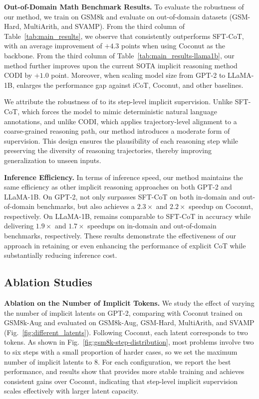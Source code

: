 \noindent \textbf{Out-of-Domain Math Benchmark Results.} 
To evaluate the robustness of our method, we train on GSM8k and evaluate on out-of-domain datasets (GSM-Hard, MultiArith, and SVAMP). From the third column of Table~\ref{tab:main_results}, we observe that \methodname consistently outperforms SFT-CoT, with an average improvement of $+4.3$ points when using Coconut as the backbone. From the third column of Table~\ref{tab:main_results-llama1b}, our method further improves upon the current SOTA implicit reasoning method CODI by $+1.0$ point. Moreover, when scaling model size from GPT-2 to LLaMA-1B, \methodname enlarges the performance gap against iCoT, Coconut, and other baselines.  

We attribute the robustness of \methodname to its step-level implicit supervision. Unlike SFT-CoT, which forces the model to mimic deterministic natural language annotations, and unlike CODI, which applies trajectory-level alignment to a coarse-grained reasoning path, our method introduces a moderate form of supervision. This design ensures the plausibility of each reasoning step while preserving the diversity of reasoning trajectories, thereby improving generalization to unseen inputs.

\noindent \textbf{Inference Efficiency.} In terms of inference speed, our method maintains the same efficiency as other implicit reasoning approaches on both GPT-2 and LLaMA-1B. On GPT-2, \methodname not only surpasses SFT-CoT on both in-domain and out-of-domain benchmarks, but also achieves a $2.3\times$ and $2.2\times$ speedup on Coconut, respectively. On LLaMA-1B, \methodname remains comparable to SFT-CoT in accuracy while delivering $1.9\times$ and $1.7\times$ speedups on in-domain and out-of-domain benchmarks, respectively. These results demonstrate the effectiveness of our approach in retaining or even enhancing the performance of explicit CoT while substantially reducing inference cost.

\subsection{Ablation Studies} 
\noindent \textbf{Ablation on the Number of Implicit Tokens.}  
We study the effect of varying the number of implicit latents on GPT-2, comparing \methodname with Coconut trained on GSM8k-Aug and evaluated on GSM8k-Aug, GSM-Hard, MultiArith, and SVAMP (Fig.~\ref{fig:different_latents}). Following Coconut, each latent corresponds to two tokens. As shown in Fig.~\ref{fig:gsm8k-step-distribution}, most problems involve two to six steps with a small proportion of harder cases, so we set the maximum number of implicit latents to 8. For each configuration, we report the best performance, and results show that \methodname provides more stable training and achieves consistent gains over Coconut, indicating that step-level implicit supervision scales effectively with larger latent capacity.



